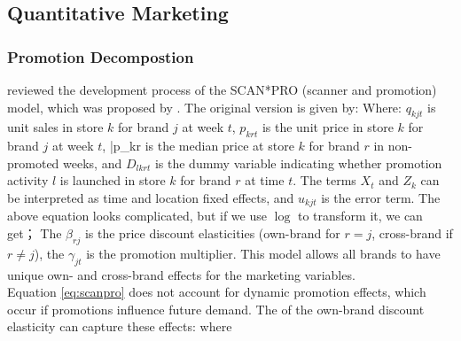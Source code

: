 \documentclass[12pt]{report}
\begin{document}
\subsection{Quantitative Marketing}

\subsubsection{Promotion Decompostion}
\cite{Leeflang2002} reviewed the development process of the SCAN*PRO (scanner and promotion) model, which was proposed by \cite{wittink1988scan}. The original version is given by:
Where: $q_{kjt}$ is unit sales in store $k$ for brand $j$ at week $t$, $p_{krt}$ is the unit price in store $k$ for brand $j$ at week $t$, \bar{p}_{kr} is the median price at store $k$ 
for brand $r$ in non-promoted weeks, and $D_{lkrt}$ is the dummy variable indicating whether promotion activity $l$ is launched in store $k$ for brand $r$ at time $t$. 
The terms $X_t$ and $Z_k$ can be interpreted as time and location fixed effects, and $u_{kjt}$ is the error term. The above equation looks complicated, but if we use $\log$ to transform it, we can get；
The $\beta_{rj}$ is the price discount elasticities (own-brand for $r=j$, cross-brand if $r\ne j$), the $\gamma_{jt}$ is the promotion multiplier. This model allows all brands 
to have unique own- and cross-brand effects for the marketing variables.\\
Equation \ref{eq:scanpro} does not account for dynamic promotion effects, which occur if promotions influence future demand. The  of the own-brand discount elasticity can capture these effects:
where 
\end{document}
